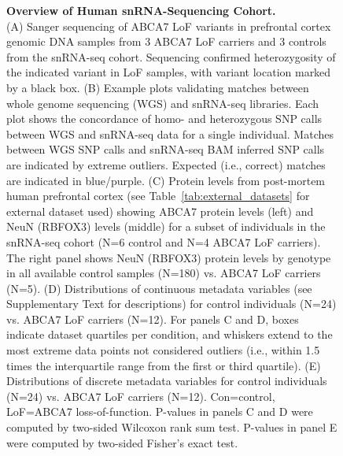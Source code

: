 \renewcommand{\thefigure}{S\arabic{figure}}

\begin{figure}[ht]
    \centering
    \caption{
        \textbf{Overview of Human snRNA-Sequencing Cohort.}\\[1ex]
        (A) Sanger sequencing of ABCA7 LoF variants in prefrontal cortex genomic DNA samples from 3 ABCA7 LoF carriers and 3 controls from the snRNA-seq cohort. Sequencing confirmed heterozygosity of the indicated variant in LoF samples, with variant location marked by a black box. 
        (B) Example plots validating matches between whole genome sequencing (WGS) and snRNA-seq libraries. Each plot shows the concordance of homo- and heterozygous SNP calls between WGS and snRNA-seq data for a single individual. Matches between WGS SNP calls and snRNA-seq BAM inferred SNP calls are indicated by extreme outliers. Expected (i.e., correct) matches are indicated in blue/purple. 
        (C) Protein levels from post-mortem human prefrontal cortex (see Table~\ref{tab:external_datasets} for external dataset used) showing ABCA7 protein levels (left) and NeuN (RBFOX3) levels (middle) for a subset of individuals in the snRNA-seq cohort (N=6 control and N=4 ABCA7 LoF carriers). The right panel shows NeuN (RBFOX3) protein levels by genotype in all available control samples (N=180) vs. ABCA7 LoF carriers (N=5). 
        (D) Distributions of continuous metadata variables (see Supplementary Text for descriptions) for control individuals (N=24) vs. ABCA7 LoF carriers (N=12). For panels C and D, boxes indicate dataset quartiles per condition, and whiskers extend to the most extreme data points not considered outliers (i.e., within 1.5 times the interquartile range from the first or third quartile). 
        (E) Distributions of discrete metadata variables for control individuals (N=24) vs. ABCA7 LoF carriers (N=12). Con=control, LoF=ABCA7 loss-of-function. P-values in panels C and D were computed by two-sided Wilcoxon rank sum test. P-values in panel E were computed by two-sided Fisher’s exact test.
    }
    \label{fig:snRNA_cohort}
\end{figure}

